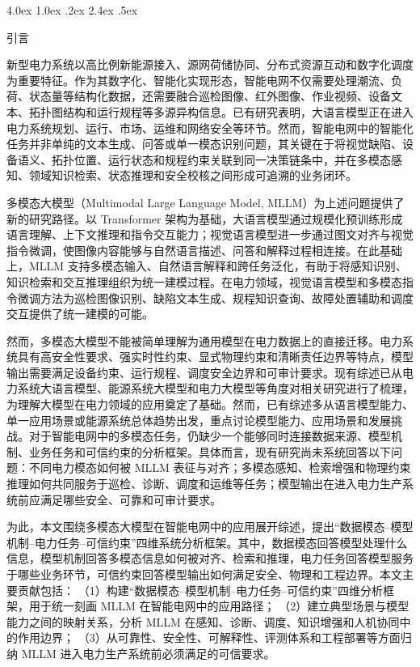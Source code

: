 \documentclass[10.5pt,compsoc]{CjC}
\makeatletter
\renewcommand\section{\@startsection {section}{1}{\z@}%
  {4.0ex \@plus 1.0ex \@minus .2ex}%
  {2.4ex \@plus .5ex}%
  {\normalfont\zihao{4-}\heiti\bfseries\raggedright}}
\theoremstyle{mystyle}
\makeatother
\begin{document}
\section{引言}

\songti
新型电力系统以高比例新能源接入、源网荷储协同、分布式资源互动和数字化调度为重要特征。作为其数字化、智能化实现形态，智能电网不仅需要处理潮流、负荷、状态量等结构化数据，还需要融合巡检图像、红外图像、作业视频、设备文本、拓扑图结构和运行规程等多源异构信息。已有研究表明，大语言模型正在进入电力系统规划、运行、市场、运维和网络安全等环节\cite{ghafari2025comprehensive,mirshekali2025review,niu2025llm_power}。然而，智能电网中的智能化任务并非单纯的文本生成、问答或单一模态识别问题，其关键在于将视觉缺陷、设备语义、拓扑位置、运行状态和规程约束关联到同一决策链条中，并在多模态感知、领域知识检索、状态推理和安全校核之间形成可追溯的业务闭环。

多模态大模型（Multimodal Large Language Model, MLLM）为上述问题提供了新的研究路径。以 Transformer 架构\cite{vaswani2017attention}为基础，大语言模型通过规模化预训练形成语言理解、上下文推理和指令交互能力\cite{brown2020language}；视觉语言模型进一步通过图文对齐与视觉指令微调，使图像内容能够与自然语言描述、问答和解释过程相连接\cite{radford2021learning,liu2023visual}。在此基础上，MLLM 支持多模态输入、自然语言解释和跨任务泛化，有助于将感知识别、知识检索和交互推理组织为统一建模过程。在电力领域，视觉语言模型和多模态指令微调方法为巡检图像识别、缺陷文本生成、规程知识查询、故障处置辅助和调度交互提供了统一建模的可能\cite{li2024foundation_power,xiang2025mllm_power}。

然而，多模态大模型不能被简单理解为通用模型在电力数据上的直接迁移。电力系统具有高安全性要求、强实时性约束、显式物理约束和清晰责任边界等特点，模型输出需要满足设备约束、运行规程、调度安全边界和可审计要求。现有综述已从电力系统大语言模型、能源系统大模型和电力大模型等角度对相关研究进行了梳理\cite{sarwar2025large,fan2025cognitive,zhang2026large,du2026key}，为理解大模型在电力领域的应用奠定了基础。然而，已有综述多从语言模型能力、单一应用场景或能源系统总体趋势出发，重点讨论模型能力、应用场景和发展挑战。对于智能电网中的多模态任务，仍缺少一个能够同时连接数据来源、模型机制、业务任务和可信约束的分析框架。具体而言，现有研究尚未系统回答以下问题：不同电力模态如何被 MLLM 表征与对齐；多模态感知、检索增强和物理约束推理如何共同服务于巡检、诊断、调度和运维等任务；模型输出在进入电力生产系统前应满足哪些安全、可靠和可审计要求。

为此，本文围绕多模态大模型在智能电网中的应用展开综述，提出``数据模态--模型机制--电力任务--可信约束''四维系统分析框架。其中，数据模态回答模型处理什么信息，模型机制回答多模态信息如何被对齐、检索和推理，电力任务回答模型服务于哪些业务环节，可信约束回答模型输出如何满足安全、物理和工程边界。本文主要贡献包括：
（1）构建``数据模态--模型机制--电力任务--可信约束''四维分析框架，用于统一刻画 MLLM 在智能电网中的应用路径；
（2）建立典型场景与模型能力之间的映射关系，分析 MLLM 在感知、诊断、调度、知识增强和人机协同中的作用边界；
（3）从可靠性、安全性、可解释性、评测体系和工程部署等方面归纳 MLLM 进入电力生产系统前必须满足的可信要求。
\end{document}
